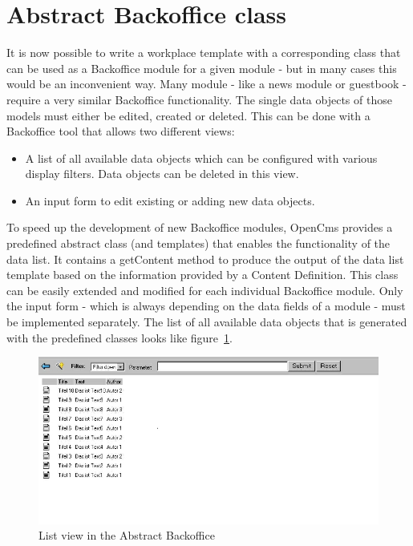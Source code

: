 \section {Abstract Backoffice class}
It is now possible to write a workplace template with a corresponding
class that can be used as a Backoffice module for a given module - but
in many cases this would be an inconvenient way. Many module - like a
news module or guestbook -  require a very similar Backoffice
functionality. The single data objects of those models must either be
edited, created or deleted. This can be done with a Backoffice tool
that allows two different views:

\begin{itemize}
\item A list of all available data objects which can be configured
with various display filters. Data objects can be deleted in this view.
       
\item An input form to edit existing or adding new data objects.
\end{itemize}

To speed up the development of new Backoffice modules, OpenCms provides
a predefined abstract class (and templates) that enables the
functionality of the data list.  It contains a {\meth getContent} method to
produce the output of the data list template based on the information
provided by a Content Definition. This class can be easily extended and
modified for each individual Backoffice module. Only the input form -
which is always depending on the data fields of a module - must be
implemented separately. The list of all available data objects that is
generated with the predefined classes looks like figure~\ref{AbstactBO}.

\begin{figure}
\begin{center}
\includegraphics[clip,width=\sgw]{pics/backOffice/list}
\end{center}
\caption[List view in the Abstract Backoffice]
    {List view in the Abstract Backoffice}
\label{AbstactBO}\jtabd
\end{figure}

